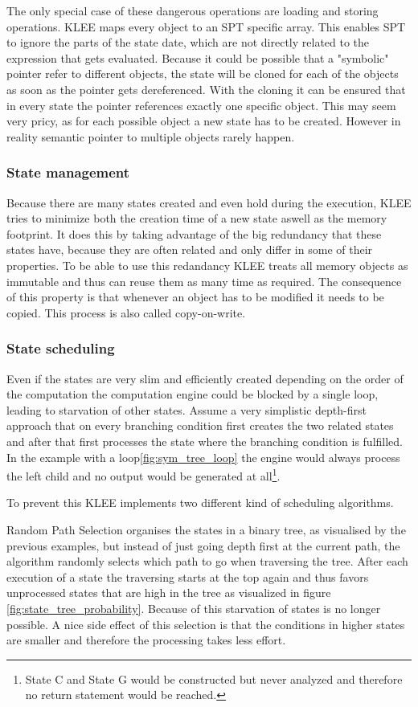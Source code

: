 The only special case of these dangerous operations are loading and storing operations. KLEE maps every object to an SPT specific array. This enables SPT to ignore the parts of the state date, which are not directly related to the expression that gets evaluated. Because it could be possible that a "symbolic" pointer refer to different objects, the state will be cloned for each of the objects as soon as the pointer gets dereferenced. With the cloning it can be ensured that in every state the pointer references exactly one specific object. This may seem very pricy, as for each possible object a new state has to be created. However in reality semantic pointer to multiple objects rarely happen. 

\subsubsection{State management}
Because there are many states created and even hold during the execution, KLEE tries to minimize both the creation time of a new state aswell as the memory footprint. It does this by taking advantage of the big redundancy that these states have, because they are often related and only differ in some of their properties.  To be able to use this redandancy KLEE treats all memory objects as immutable and thus can reuse them as many time as required. The consequence of this property is that whenever an object has to be modified it needs to be copied. This process is also called copy-on-write.

\subsubsection{State scheduling}
Even if the states are very slim and efficiently created depending on the order of the computation the computation engine could be blocked by a single loop, leading to starvation of other states. Assume a very simplistic depth-first approach that on every branching condition first creates the two related states and after that first processes the state where the branching condition is fulfilled. In the example with a loop\ref{fig:sym_tree_loop} the engine would always process the left child and no output would be generated at all\footnote{State C and State G would be constructed but never analyzed and therefore no return statement would be reached.}.

To prevent this KLEE implements two different kind of scheduling algorithms. 

Random Path Selection organises the states in a binary tree, as visualised by the previous examples, but instead of just going depth first at the current path, the algorithm randomly selects which path to go when traversing the tree. After each execution of a state the traversing starts at the top again and thus favors unprocessed states that are high in the tree as visualized in figure \ref{fig:state_tree_probability}. Because of this starvation of states is no longer possible. A nice side effect of this selection is that the conditions in higher states are smaller and therefore the processing takes less effort.


